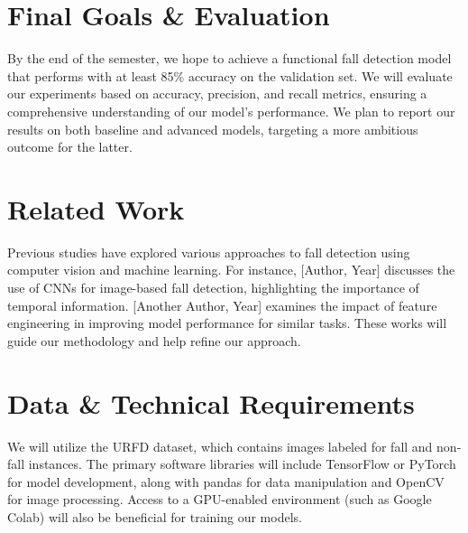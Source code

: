 \documentclass{article} %
\begin{document}
\section{Final Goals \& Evaluation}
By the end of the semester, we hope to achieve a functional fall detection model that performs with at least 85\% accuracy on the validation set. We will evaluate our experiments based on accuracy, precision, and recall metrics, ensuring a comprehensive understanding of our model's performance. We plan to report our results on both baseline and advanced models, targeting a more ambitious outcome for the latter.

\section{Related Work}
Previous studies have explored various approaches to fall detection using computer vision and machine learning. For instance, [Author, Year] discusses the use of CNNs for image-based fall detection, highlighting the importance of temporal information. [Another Author, Year] examines the impact of feature engineering in improving model performance for similar tasks. These works will guide our methodology and help refine our approach.

\section{Data \& Technical Requirements}
We will utilize the URFD dataset, which contains images labeled for fall and non-fall instances. The primary software libraries will include TensorFlow or PyTorch for model development, along with pandas for data manipulation and OpenCV for image processing. Access to a GPU-enabled environment (such as Google Colab) will also be beneficial for training our models.

\nocite{Bengio+chapter2007}
\nocite{Hinton06}



\end{document}
